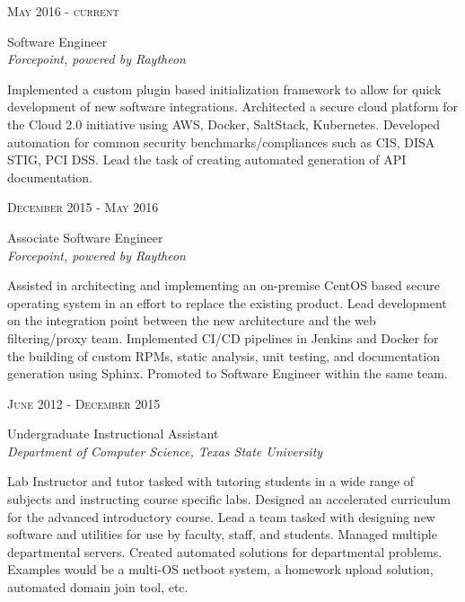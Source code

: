 \documentclass[10pt]{article} %
\begin{document}
\begin{minipage}[t]{0.5\textwidth}
{\raggedleft\textsc{May 2016 - current}\par}

{\raggedright\large Software Engineer\\
\textit{Forcepoint, powered by Raytheon}\\[5pt]}

\normalsize{Implemented a custom plugin based initialization framework to allow for quick development of new software integrations. Architected a secure cloud platform for the Cloud 2.0 initiative using AWS, Docker, SaltStack, Kubernetes. Developed automation for common  security benchmarks/compliances such as CIS, DISA STIG, PCI DSS. Lead the task of creating automated generation of API documentation.}\\



{\raggedleft\textsc{December 2015 - May 2016}\par}

{\raggedright\large Associate Software Engineer\\
\textit{Forcepoint, powered by Raytheon}\\[5pt]}

\normalsize{Assisted in architecting and implementing an on-premise CentOS based secure operating system in an effort to replace the existing product. Lead development on the integration point between the new architecture and the web filtering/proxy team. Implemented CI/CD pipelines in Jenkins and Docker for the building of custom RPMs, static analysis, unit testing, and documentation generation using Sphinx. Promoted to Software Engineer within the same team.}\\



{\raggedleft\textsc{June 2012 - December 2015}\par}

{\raggedright\large Undergraduate Instructional Assistant\\
\textit{Department of Computer Science, Texas State University}\\[5pt]}

\normalsize{Lab Instructor and tutor tasked with tutoring students in a wide range of subjects and instructing course specific labs. Designed an accelerated curriculum for the advanced introductory course. Lead a team tasked with designing new software and utilities for use by faculty, staff, and students. Managed multiple departmental servers. Created automated solutions for departmental problems. Examples would be a multi-OS netboot system, a homework upload solution, automated domain join tool, etc.}\\


\end{minipage}
\end{document}
